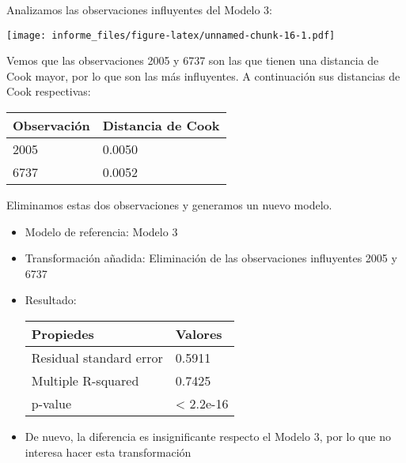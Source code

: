 \documentclass[
]{article}
\begin{document}
Analizamos las observaciones influyentes del Modelo 3:

\texttt{[image: informe\_files/figure-latex/unnamed-chunk-16-1.pdf]}

Vemos que las observaciones 2005 y 6737 son las que tienen una distancia
de Cook mayor, por lo que son las más influyentes. A continuación sus
distancias de Cook respectivas:

\begin{longtable}[]{@{}ll@{}}
\toprule
Observación & Distancia de Cook\tabularnewline
\midrule
\endhead
2005 & 0.0050\tabularnewline
6737 & 0.0052\tabularnewline
\bottomrule
\end{longtable}

Eliminamos estas dos observaciones y generamos un nuevo modelo.

\begin{itemize}
\item
  Modelo de referencia: Modelo 3
\item
  Transformación añadida: Eliminación de las observaciones influyentes
  2005 y 6737
\item
  Resultado:

  \begin{longtable}[]{@{}ll@{}}
  \toprule
  Propiedes & Valores\tabularnewline
  \midrule
  \endhead
  Residual standard error & 0.5911\tabularnewline
  Multiple R-squared & 0.7425\tabularnewline
  p-value & \textless{} 2.2e-16\tabularnewline
  \bottomrule
  \end{longtable}
\item
  De nuevo, la diferencia es insignificante respecto el Modelo 3, por lo
  que no interesa hacer esta transformación
\end{itemize}
\end{document}
